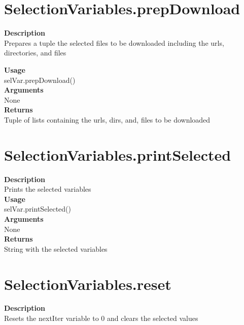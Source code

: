 \documentclass[11pt, oneside]{article}
\begin{document}
\section{SelectionVariables.prepDownload}

\textbf{Description} \\
        Prepares a tuple the selected files to be downloaded including
        the urls, directories, and files

\noindent\textbf{Usage} \\
        selVar.prepDownload() \\

\noindent\textbf{Arguments} \\
        None\\

\noindent\textbf{Returns} \\
        Tuple of lists containing the urls, dirs, and, files to be downloaded\\


\section{SelectionVariables.printSelected}

\textbf{Description} \\
        Prints the selected variables\\

\noindent\textbf{Usage} \\
        selVar.printSelected() \\

\noindent\textbf{Arguments} \\
        None\\

\noindent\textbf{Returns} \\
        String with the selected variables\\


\section{SelectionVariables.reset}

\textbf{Description} \\
        Resets the nextIter variable to 0 and clears the selected values\\
\end{document}
